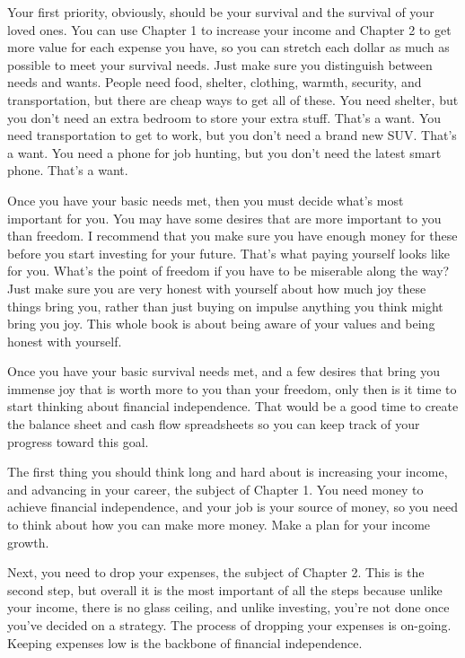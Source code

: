 Your first priority, obviously, should be your survival and the survival of your loved ones. You can use Chapter 1 to increase your income and Chapter 2 to get more value for each expense you have, so you can stretch each dollar as much as possible to meet your survival needs. Just make sure you distinguish between needs and wants. People need food, shelter, clothing, warmth, security, and transportation, but there are cheap ways to get all of these. You need shelter, but you don't need an extra bedroom to store your extra stuff. That's a want. You need transportation to get to work, but you don't need a brand new SUV. That's a want. You need a phone for job hunting, but you don't need the latest smart phone. That's a want.

Once you have your basic needs met, then you must decide what's most important for you. You may have some desires that are more important to you than freedom. I recommend that you make sure you have enough money for these before you start investing for your future. That's what paying yourself looks like for you. What's the point of freedom if you have to be miserable along the way? Just make sure you are very honest with yourself about how much joy these things bring you, rather than just buying on impulse anything you think might bring you joy. This whole book is about being aware of your values and being honest with yourself.

Once you have your basic survival needs met, and a few desires that bring you immense joy that is worth more to you than your freedom, only then is it time to start thinking about financial independence. That would be a good time to create the balance sheet and cash flow spreadsheets so you can keep track of your progress toward this goal.

The first thing you should think long and hard about is increasing your income, and advancing in your career, the subject of Chapter 1. You need money to achieve financial independence, and your job is your source of money, so you need to think about how you can make more money. Make a plan for your income growth.

Next, you need to drop your expenses, the subject of Chapter 2. This is the second step, but overall it is the most important of all the steps because unlike your income, there is no glass ceiling, and unlike investing, you're not done once you've decided on a strategy. The process of dropping your expenses is on-going. Keeping expenses low is the backbone of financial independence.

